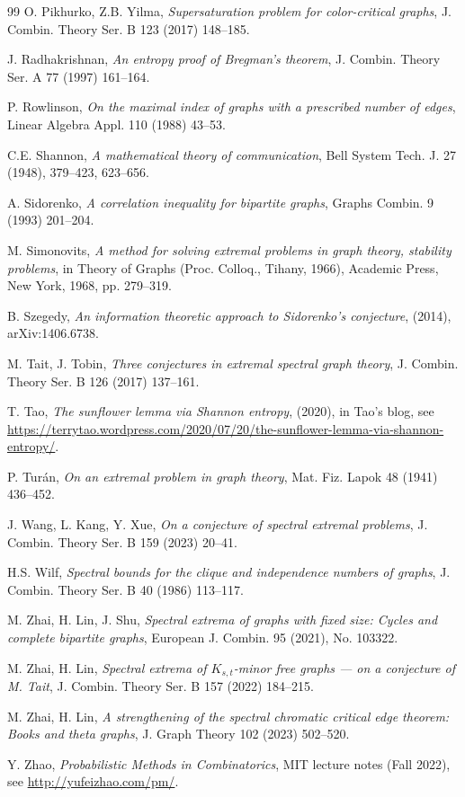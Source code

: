 \documentclass[11pt, a4paper]{article}
\theoremstyle{definition}
\theoremstyle{plain}
\begin{document}
\begin{thebibliography}{99}
O. Pikhurko, Z.B. Yilma, 
\emph{Supersaturation problem for color-critical graphs}, 
J. Combin. Theory Ser. B 123 (2017) 148--185.


J. Radhakrishnan,
\emph{An entropy proof of Bregman's theorem},
{J. Combin. Theory Ser. A}  {77} (1997)  161--164.

P. Rowlinson,
\emph{On the maximal index of graphs with a
prescribed number of edges},
{Linear Algebra Appl.}  {110} (1988) 43--53.

C.E. Shannon,
\emph{A mathematical theory of communication},
{Bell System Tech. J.}  {27} (1948),
379--423, 623--656.

A. Sidorenko, 
\emph{A correlation inequality for bipartite graphs}, 
 Graphs Combin. 9 (1993) 201--204.

M. Simonovits,
 \emph{A method for solving extremal problems in graph theory, stability problems},
in {Theory of Graphs (Proc. Colloq., Tihany, 1966)}, Academic Press, New York, 1968, pp. 279--319.


B. Szegedy,
\emph{An information theoretic approach to
Sidorenko's conjecture}, (2014), arXiv:1406.6738.

M. Tait, J. Tobin,
\emph{Three conjectures in extremal spectral graph theory},
J. Combin. Theory Ser. B 126 (2017) 137--161.

T. Tao, \emph{The sunflower lemma via Shannon entropy}, (2020), in Tao's blog, 
see \url{https://terrytao.wordpress.com/2020/07/20/the-sunflower-lemma-via-shannon-entropy/}. 

P. Tur\'an,
\emph{On an extremal problem in graph theory},
{Mat. Fiz. Lapok}  {48} (1941) 436--452.

J. Wang, L. Kang, Y. Xue,
\emph{On a conjecture of spectral extremal problems},
{J. Combin. Theory Ser. B}  {159} (2023) 
20--41.

H.S. Wilf,
\emph{Spectral bounds for the clique and independence numbers of graphs},
{J. Combin. Theory Ser. B}  {40} (1986) 113--117.

M. Zhai, H. Lin, J. Shu, 
\emph{Spectral extrema of graphs with fixed size: Cycles and complete bipartite graphs}, 
European J. Combin. 95 (2021), No. 103322.


M. Zhai, H. Lin,  
\emph{Spectral extrema of $K_{s,t}$-minor free 
graphs --- on a conjecture of M. Tait}, 
J. Combin. Theory Ser. B 157 (2022) 184--215. 

M. Zhai, H. Lin,
\emph{A strengthening of the spectral chromatic critical
edge theorem: Books and theta graphs},
{J. Graph Theory}  {102} (2023) 502--520.

Y. Zhao, 
\emph{Probabilistic Methods in Combinatorics}, 
MIT lecture notes (Fall 2022), see \url{http://yufeizhao.com/pm/}. 


\end{thebibliography}
\end{document}
